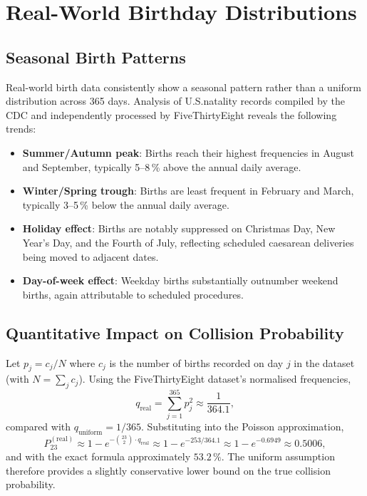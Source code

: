 \documentclass[12pt]{report}
\theoremstyle{definition}
\begin{document}
\chapter{Real-World Birthday Distributions}
\label{sec:realdata}

\section{Seasonal Birth Patterns}

Real-world birth data consistently show a seasonal pattern rather than a uniform
distribution across 365 days.  Analysis of U.S.\@ natality records compiled by the
CDC and independently processed by FiveThirtyEight \citep{hickey2014} reveals the
following trends:

\begin{itemize}
  \item \textbf{Summer/Autumn peak}: Births reach their highest frequencies in August
        and September, typically 5–8\,\% above the annual daily average.
  \item \textbf{Winter/Spring trough}: Births are least frequent in February and
        March, typically 3–5\,\% below the annual daily average.
  \item \textbf{Holiday effect}: Births are notably suppressed on Christmas Day,
        New Year's Day, and the Fourth of July, reflecting scheduled caesarean
        deliveries being moved to adjacent dates.
  \item \textbf{Day-of-week effect}: Weekday births substantially outnumber weekend
        births, again attributable to scheduled procedures.
\end{itemize}

\section{Quantitative Impact on Collision Probability}

Let $p_j = c_j / N$ where $c_j$ is the number of births recorded on day $j$ in the
dataset (with $N = \sum_j c_j$).  Using the FiveThirtyEight dataset's normalised
frequencies,
\[
  q_{\text{real}} = \sum_{j=1}^{365} p_j^2 \approx \frac{1}{364.1},
\]
compared with $q_{\text{uniform}} = 1/365$.  Substituting into the Poisson
approximation,
\[
  P_{23}^{(\text{real})} \approx 1 - e^{-\binom{23}{2} \cdot q_{\text{real}}}
  \approx 1 - e^{-253/364.1} \approx 1 - e^{-0.6949} \approx 0.5006,
\]
and with the exact formula approximately $53.2\,\%$.  The uniform assumption therefore
provides a slightly conservative lower bound on the true collision probability.
\end{document}
